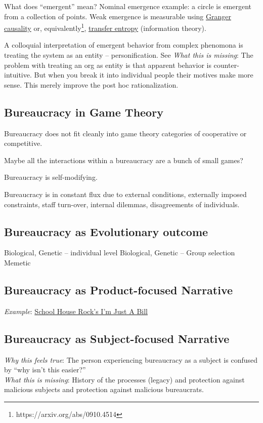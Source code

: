 What does ``emergent'' mean? Nominal emergence example: a circle is emergent from a collection of points. Weak emergence is measurable using \href{https://en.wikipedia.org/wiki/Granger_causality}{Granger causality} or, equivalently\footnote{https://arxiv.org/abs/0910.4514}, \href{https://en.wikipedia.org/wiki/Transfer_entropy}{transfer entropy} (information theory). 


A colloquial interpretation of emergent behavior from complex phenomona is treating the system as an entity -- personification.
See \cite{2002_Gall}
\textit{What this is missing}: The problem with treating an org as entity is that apparent behavior is counter-intuitive. But when you break it into individual people their motives make more sense. This merely improve the post hoc rationalization. 

\subsection{Bureaucracy in Game Theory}
Bureaucracy does not fit cleanly into game theory categories of cooperative or competitive.

Maybe all the interactions within a bureaucracy are a bunch of small games?

Bureaucracy is self-modifying. 

Bureaucracy is in constant flux due to external conditions, externally imposed constraints, staff turn-over, internal dilemmas, disagreements of individuals. 




\subsection{Bureaucracy as Evolutionary outcome}

Biological, Genetic -- individual level
Biological, Genetic -- Group selection
Memetic

\subsection{Bureaucracy as Product-focused Narrative}
\textit{Example}: \href{https://www.youtube.com/watch?v=OgVKvqTItto}{School House Rock's I'm Just A Bill}\\

\subsection{Bureaucracy as Subject-focused Narrative}
\textit{Why this feels true}: The person experiencing bureaucracy as a subject is confused by ``why isn't this easier?''  \\
\textit{What this is missing}: History of the processes (legacy) and protection against malicious subjects and protection against malicious bureaucrats. 


